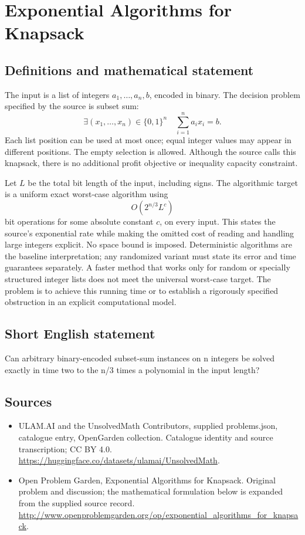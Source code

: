 \documentclass[11pt,a4paper]{article}
\begin{document}
\section*{Exponential Algorithms for Knapsack}\label{statement}

\subsection{Definitions and mathematical statement}
The input is a list of integers $a_1,\ldots,a_n,b$, encoded in binary.
The decision problem specified by the source is subset sum:
\[
 \exists (x_1,\ldots,x_n)\in\{0,1\}^n\quad
                        \sum_{i=1}^n a_ix_i=b.
\]
Each list position can be used at most once; equal integer values
may appear in different positions. The empty selection is allowed.
Although the source calls this knapsack, there is no additional
profit objective or inequality capacity constraint.

Let $L$ be the total bit length of the input, including signs. The
algorithmic target is a uniform exact worst-case algorithm using
\[
                            O(2^{n/3}L^c)
\]
bit operations for some absolute constant $c$, on every input.
This states the source's exponential rate while making the omitted
cost of reading and handling large integers explicit. No space bound
is imposed. Deterministic algorithms are the baseline interpretation;
any randomized variant must state its error and time guarantees
separately. A faster method that works only for random or specially
structured integer lists does not meet the universal worst-case
target. The problem is to achieve this running time or to establish
a rigorously specified obstruction in an explicit computational model.
\subsection{Short English statement}
Can arbitrary binary-encoded subset-sum instances on n integers be solved exactly in time two to the n/3 times a polynomial in the input length?
\subsection{Sources}
\begin{itemize}
\item[S1] ULAM.AI and the UnsolvedMath Contributors, supplied problems.json, catalogue entry, OpenGarden collection. Catalogue identity and source transcription; CC BY 4.0.
\url{https://huggingface.co/datasets/ulamai/UnsolvedMath}.
\item[S2] Open Problem Garden, Exponential Algorithms for Knapsack. Original problem and discussion; the mathematical formulation below is expanded from the supplied source record.
\url{http://www.openproblemgarden.org/op/exponential_algorithms_for_knapsack}.
\end{itemize}
\end{document}
